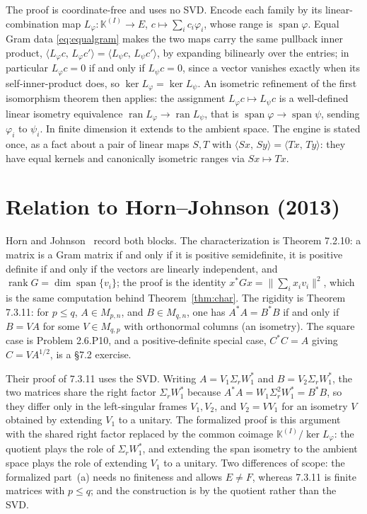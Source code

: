 \documentclass[11pt]{article}
\newcommand{\M}{M}
\newcommand{\inner}[2]{\langle #1,\,#2\rangle}
\newcommand{\adj}{^{*}}
\newcommand{\KK}{\mathbb K}
\newcommand{\gram}{G}
\DeclareMathOperator{\rank}{rank}
\DeclareMathOperator{\spann}{span}
\DeclareMathOperator{\ran}{ran}
\theoremstyle{remark}
\begin{document}
The proof is coordinate-free and uses no SVD.  Encode each family by its
linear-combination map $L_\varphi:\KK^{(I)}\to E$, $c\mapsto\sum_i c_i\varphi_i$,
whose range is $\spann\varphi$.  Equal Gram data \eqref{eq:equalgram} makes the
two maps carry the same pullback inner product,
$\inner{L_\varphi c}{L_\varphi c'}=\inner{L_\psi c}{L_\psi c'}$, by expanding
bilinearly over the entries; in particular $L_\varphi c=0$ if and only if
$L_\psi c=0$, since a vector vanishes exactly when its self-inner-product does, so
$\ker L_\varphi=\ker L_\psi$.  An isometric refinement of the first isomorphism
theorem then applies: the assignment $L_\varphi c\mapsto L_\psi c$ is a
well-defined linear isometry equivalence $\ran L_\varphi\to\ran L_\psi$, that is
$\spann\varphi\to\spann\psi$, sending $\varphi_i$ to $\psi_i$.  In finite
dimension it extends to the ambient space.  The engine is stated once, as a fact
about a pair of linear maps $S,T$ with $\inner{Sx}{Sy}=\inner{Tx}{Ty}$: they have
equal kernels and canonically isometric ranges via $Sx\mapsto Tx$.

\section{Relation to Horn--Johnson (2013)}

Horn and Johnson~\cite{HornJohnson2013} record both blocks.  The characterization
is Theorem 7.2.10: a matrix is a Gram matrix if and only if it is positive
semidefinite, it is positive definite if and only if the vectors are linearly
independent, and $\rank\gram=\dim\spann\{v_i\}$; the proof is the identity
$x\adj\gram x=\bigl\|\sum_i x_i v_i\bigr\|^2$, which is the same computation
behind Theorem~\ref{thm:char}.  The rigidity is Theorem 7.3.11: for $p\le q$,
$A\in\M_{p,n}$, and $B\in\M_{q,n}$, one has $A\adj A=B\adj B$ if and only if
$B=VA$ for some $V\in\M_{q,p}$ with orthonormal columns (an isometry).  The square
case is Problem 2.6.P10, and a positive-definite special case, $C\adj C=A$ giving
$C=VA^{1/2}$, is a \S7.2 exercise.

Their proof of 7.3.11 uses the SVD.  Writing $A=V_1\Sigma_r W_1\adj$ and
$B=V_2\Sigma_r W_1\adj$, the two matrices share the right factor $\Sigma_r W_1\adj$
because $A\adj A=W_1\Sigma_r^2 W_1\adj=B\adj B$, so they differ only in the
left-singular frames $V_1,V_2$, and $V_2=VV_1$ for an isometry $V$ obtained by
extending $V_1$ to a unitary.  The formalized proof is this argument with the
shared right factor replaced by the common coimage $\KK^{(I)}/\ker L_\varphi$: the
quotient plays the role of $\Sigma_r W_1\adj$, and extending the span isometry to
the ambient space plays the role of extending $V_1$ to a unitary.  Two differences
of scope: the formalized part~(a) needs no finiteness and allows $E\ne F$, whereas
7.3.11 is finite matrices with $p\le q$; and the construction is by the quotient
rather than the SVD.
\end{document}
